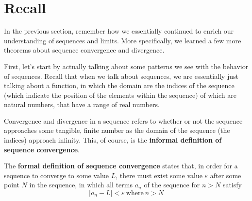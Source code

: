 \documentclass{report}
\begin{document}
\begin{sloppypar}
\section{Recall}
In the previous section, remember how we essentially continued to enrich our understanding of sequences and limits.
More specifically, we learned a few more theorems about sequence convergence and divergence.
\par First, let's start by actually talking about some patterns we see with the behavior of sequences. Recall
that when we talk about sequences, we are essentially just talking about a function, in which the domain are the indices of the
sequence (which indicate the position of the elements within the sequence) of which are natural numbers, that have a range of real numbers.
\par Convergence and divergence in a sequence refers to whether or not the sequence approaches some tangible, finite number
as the domain of the sequence (the indices) approach infinity. This, of course, is the \textbf{informal definition of
  sequence convergence}.
\par The \textbf{formal definition of sequence convergence} states that, in order for a sequence to converge to some value $ L $, there must exist some value $ \varepsilon $ after some point $ N $ in the sequence, in which all terms $ a_{n} $ of the sequence for $ n > N $ satisfy
\[ | a_{n} - L | < \varepsilon ~\textrm{where} ~ n > N \]


\end{sloppypar}
\end{document}
